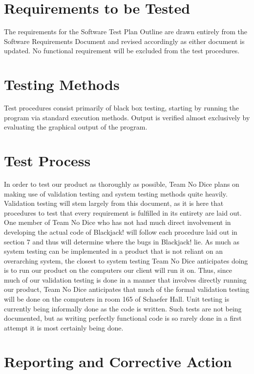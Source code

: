 \documentclass{article}
\begin{document}
\section{Requirements to be Tested}

The requirements for the Software Test Plan Outline are drawn entirely from the Software Requirements Document and revised accordingly as either document is updated.  No functional requirement will be excluded from the test procedures.  %

\section{Testing Methods}
Test procedures consist primarily of black box testing, starting by running the program via standard execution methods.  Output is verified almost exclusively by evaluating the graphical output of the program.

\section{Test Process}

In order to test our product as thoroughly as possible, Team No Dice plans on making use of validation testing and system testing methods quite heavily.  Validation testing will stem largely from this document, as it is here that procedures to test that every requirement is fulfilled in its entirety are laid out.  One member of Team No Dice who has not had much direct involvement in developing the actual code of Blackjack! will follow each procedure laid out in section 7 and thus will determine where the bugs in Blackjack! lie.  As much as system testing can be implemented in a product that is not reliant on an overarching system, the closest to system testing Team No Dice anticipates doing is to run our product on the computers our client will run it on.  Thus, since much of our validation testing is done in a manner that involves directly running our product, Team No Dice anticipates that much of the formal validation testing will be done on the computers in room 165 of Schaefer Hall.  Unit testing is currently being informally done as the code is written.  Such tests are not being documented, but as writing perfectly functional code is so rarely done in a first attempt it is most certainly being done.  

\section{Reporting and Corrective Action}
\end{document}
